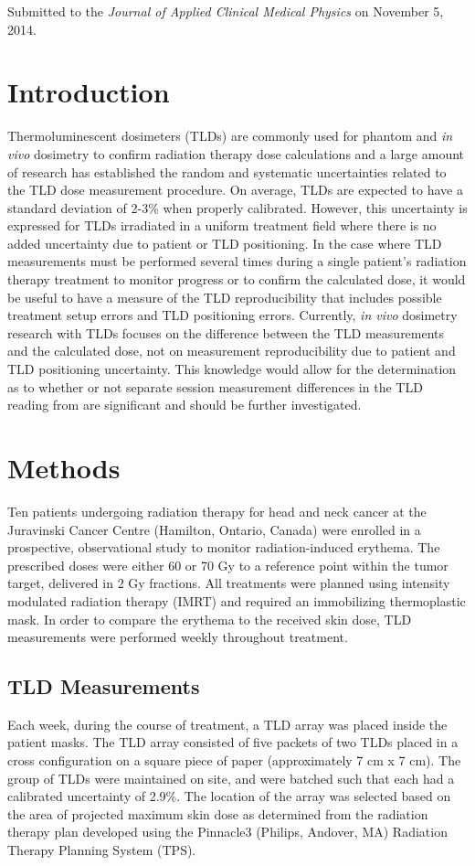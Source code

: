 \noindent Submitted to the \textit{Journal of Applied Clinical Medical Physics} on November 5, 2014.

\section{Introduction}
Thermoluminescent dosimeters (TLDs) are commonly used for phantom and \emph{in vivo} dosimetry to confirm radiation therapy dose calculations\cite{Essers1999,Mijnheer2013} and a large amount of research has established the random and systematic uncertainties related to the TLD dose measurement procedure.\cite{Kirby1992,Mijnheer1987} On average, TLDs are expected to have a standard deviation of 2-3\% when properly calibrated.\cite{Essers1999,Ostwald1995} However, this uncertainty is expressed for TLDs irradiated in a uniform treatment field where there is no added uncertainty due to patient or TLD positioning. In the case where TLD measurements must be performed several times during a single patient’s radiation therapy treatment to monitor progress or to confirm the calculated dose, it would be useful to have a measure of the TLD reproducibility that includes possible treatment setup errors and TLD positioning errors. Currently, \emph{in vivo} dosimetry research with TLDs focuses on the difference between the TLD measurements and the calculated dose,\cite{Ruden1976,Leunens1990,Tung2004} not on measurement reproducibility due to patient and TLD positioning uncertainty. This knowledge would allow for the determination as to whether or not separate session measurement differences in the TLD reading from are significant and should be further investigated.

\section{Methods}
Ten patients undergoing radiation therapy for head and neck cancer at the Juravinski Cancer Centre (Hamilton, Ontario, Canada) were enrolled in a prospective, observational study to monitor radiation-induced erythema.\cite{Glennie2014c} The prescribed doses were either 60 or 70 Gy to a reference point within the tumor target, delivered in 2 Gy fractions. All treatments were planned using intensity modulated radiation therapy (IMRT) and required an immobilizing thermoplastic mask. In order to compare the erythema to the received skin dose, TLD measurements were performed weekly throughout treatment.

\subsection{TLD Measurements}
Each week, during the course of treatment, a TLD array was placed inside the patient masks. The TLD array consisted of five packets of two TLDs placed in a cross configuration on a square piece of paper (approximately 7 cm x 7 cm). The group of TLDs were maintained on site, and were batched such that each had a calibrated uncertainty of 2.9\%. The location of the array was selected based on the area of projected maximum skin dose as determined from the radiation therapy plan developed using the Pinnacle3 (Philips, Andover, MA) Radiation Therapy Planning System (TPS).

